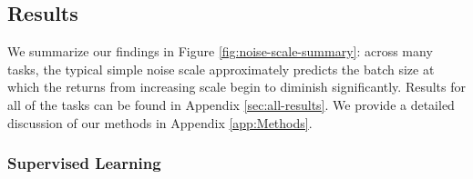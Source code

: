\documentclass[english]{article}
\begin{document}
\subsection{Results}

We summarize our findings in Figure \ref{fig:noise-scale-summary}: across many tasks, the typical simple noise scale approximately predicts the batch size at which the returns from increasing scale begin to diminish significantly.   Results for all of the tasks can be found in Appendix \ref{sec:all-results}.  We provide a detailed discussion of our methods in Appendix \ref{app:Methods}.  


\subsubsection*{Supervised Learning}
\end{document}
